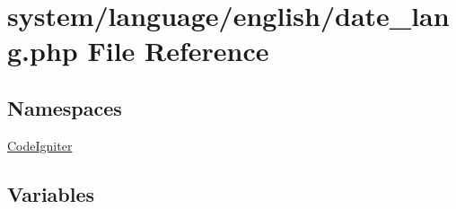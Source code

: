 \hypertarget{date__lang_8php}{}\section{system/language/english/date\+\_\+lang.php File Reference}
\label{date__lang_8php}
\subsection*{Namespaces}
\begin{DoxyCompactItemize}
\item 
 \mbox{\hyperlink{namespace_code_igniter}{Code\+Igniter}}
\end{DoxyCompactItemize}
\subsection*{Variables}
